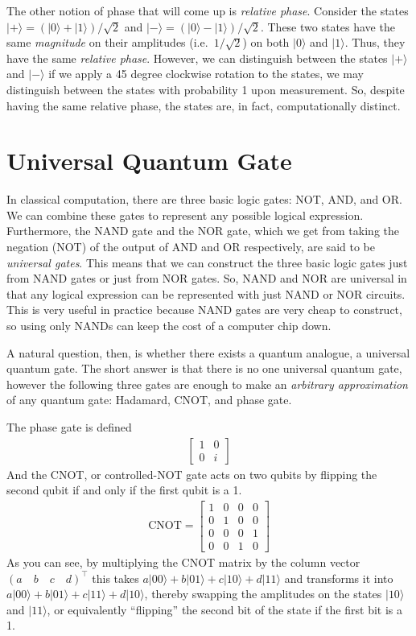 \documentclass[12pt,twoside]{reedthesis}
\theoremstyle{definition}
\newcommand{\ketz}{\ensuremath{\lvert 0\rangle}\xspace}
\newcommand{\keto}{\ensuremath{\lvert 1\rangle}\xspace}
\newcommand{\ket}[1]{\ensuremath{\lvert #1\rangle}\xspace}
\newcommand{\Hplus}{\ensuremath{\lvert + \rangle}\xspace}
\newcommand{\Hminus}{\ensuremath{\lvert- \rangle}\xspace}
\begin{document}
The other notion of phase that will come up is \textit{relative phase}. Consider the states $\Hplus = (\ketz + \keto)/\sqrt{2}$ and $\Hminus = (\ketz- \keto)/\sqrt{2}$. These two states have the same \textit{magnitude} on their amplitudes (i.e.~$1/\sqrt{2}$) on both $\ketz$ and $\keto$. Thus, they have the same \textit{relative phase}. However, we can distinguish between the states $\Hplus$ and $\Hminus$ if we apply a 45 degree clockwise rotation to the states, we may distinguish between the states with probability 1 upon measurement. So, despite having the same relative phase, the states are, in fact, computationally distinct.

\section{Universal Quantum Gate}
In classical computation, there are three basic logic gates: NOT, AND, and OR. We can combine these gates to represent any possible logical expression. Furthermore, the NAND gate and the NOR gate, which we get from taking the negation (NOT) of the output of AND and OR respectively, are said to be \textit{universal gates}. This means that we can construct the three basic logic gates just from NAND gates or just from NOR gates. So, NAND and NOR are universal in that any logical expression can be represented with just NAND or NOR circuits. This is very useful in practice because NAND gates are very cheap to construct, so using only NANDs can keep the cost of a computer chip down.

A natural question, then, is whether there exists a quantum analogue, a universal quantum gate. The short answer is that there is no one universal quantum gate, however the following three gates are enough to make an \textit{arbitrary approximation} of any quantum gate: Hadamard, CNOT, and phase gate. 

The phase gate is defined
\begin{align}
\begin{bmatrix}
1 & 0\\
0 & i 
\end{bmatrix}
\end{align}
And the CNOT, or controlled-NOT gate acts on two qubits by flipping the second qubit if and only if the first qubit is a 1. 
\begin{align}
\text{CNOT} = \begin{bmatrix}
1 & 0 & 0 & 0 \\
0 & 1 & 0 & 0 \\
0 & 0 & 0 & 1 \\
0 & 0 & 1 & 0
\end{bmatrix}
\end{align}
As you can see, by multiplying the CNOT matrix by the column vector $(a\quad b\quad c\quad d)^\intercal$ this takes $a\ket{00} + b\ket{01} + c\ket{10} + d\ket{11}$ and transforms it into $a\ket{00} + b\ket{01} + c\ket{11} + d\ket{10}$, thereby swapping the amplitudes on the states $\ket{10}$ and $\ket{11}$, or equivalently ``flipping'' the second bit of the state if the first bit is a 1. 
\end{document}
